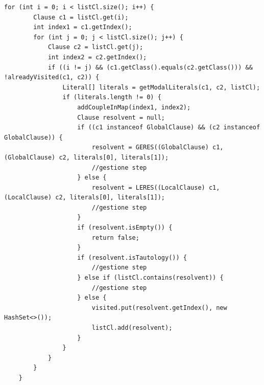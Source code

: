 \documentclass[a4paper,12pt]{report}
\begin{document}
\begin{minipage}{\linewidth}
    \small
    \begin{lstlisting}[caption={cicli for innestati per l'esecuzione delle regole LERES e GERES nel metodo \texttt{isSatisfiable}}, label={method:isSatisfiable}]
    for (int i = 0; i < listCl.size(); i++) {
        Clause c1 = listCl.get(i);
        int index1 = c1.getIndex();
        for (int j = 0; j < listCl.size(); j++) {
            Clause c2 = listCl.get(j);
            int index2 = c2.getIndex();
            if ((i != j) && (c1.getClass().equals(c2.getClass())) && !alreadyVisited(c1, c2)) {
                Literal[] literals = getModalLiterals(c1, c2, listCl);
                if (literals.length != 0) {
                    addCoupleInMap(index1, index2);
                    Clause resolvent = null;
                    if ((c1 instanceof GlobalClause) && (c2 instanceof GlobalClause)) {
                        resolvent = GERES((GlobalClause) c1, (GlobalClause) c2, literals[0], literals[1]);
                        //gestione step
                    } else {
                        resolvent = LERES((LocalClause) c1, (LocalClause) c2, literals[0], literals[1]);
                        //gestione step
                    } 
                    if (resolvent.isEmpty()) {
                        return false;
                    }
                    if (resolvent.isTautology()) {
                        //gestione step
                    } else if (listCl.contains(resolvent)) {
                        //gestione step
                    } else {
                        visited.put(resolvent.getIndex(), new HashSet<>());
                        listCl.add(resolvent);
                    }
                }
            }
        }
    }
    \end{lstlisting}
\end{minipage}







% 
% 
\end{document}
